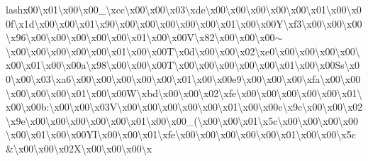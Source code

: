 lash{}x00\textbackslash{}x01\textbackslash{}x00\textbackslash{}x00\+\_\+\textbackslash{}xcc\textbackslash{}x00\textbackslash{}x00\textbackslash{}x03\textbackslash{}xde\textbackslash{}x00\textbackslash{}x00\textbackslash{}x00\textbackslash{}x00\textbackslash{}x00\textbackslash{}x01\textbackslash{}x00\textbackslash{}x00f\textbackslash{}x1d\textbackslash{}x00\textbackslash{}x00\textbackslash{}x01\textbackslash{}x90\textbackslash{}x00\textbackslash{}x00\textbackslash{}x00\textbackslash{}x00\textbackslash{}x00\textbackslash{}x01\textbackslash{}x00\textbackslash{}x00\+Y\textbackslash{}xf3\textbackslash{}x00\textbackslash{}x00\textbackslash{}x00\textbackslash{}x96\textbackslash{}x00\textbackslash{}x00\textbackslash{}x00\textbackslash{}x00\textbackslash{}x00\textbackslash{}x01\textbackslash{}x00\textbackslash{}x00\+V\textbackslash{}x82\textbackslash{}x00\textbackslash{}x00\textbackslash{}x00$\sim$\textbackslash{}x00\textbackslash{}x00\textbackslash{}x00\textbackslash{}x00\textbackslash{}x00\textbackslash{}x01\textbackslash{}x00\textbackslash{}x00\+T\textbackslash{}x0d\textbackslash{}x00\textbackslash{}x00\textbackslash{}x02\textbackslash{}xe0\textbackslash{}x00\textbackslash{}x00\textbackslash{}x00\textbackslash{}x00\textbackslash{}x00\textbackslash{}x01\textbackslash{}x00\textbackslash{}x00a\textbackslash{}x98\textbackslash{}x00\textbackslash{}x00\textbackslash{}x00\+T\textbackslash{}x00\textbackslash{}x00\textbackslash{}x00\textbackslash{}x00\textbackslash{}x00\textbackslash{}x01\textbackslash{}x00\textbackslash{}x00\+Ss\textbackslash{}x00\textbackslash{}x00\textbackslash{}x03\textbackslash{}xa6\textbackslash{}x00\textbackslash{}x00\textbackslash{}x00\textbackslash{}x00\textbackslash{}x00\textbackslash{}x01\textbackslash{}x00\textbackslash{}x00e9\textbackslash{}x00\textbackslash{}x00\textbackslash{}x00\textbackslash{}xfa\textbackslash{}x00\textbackslash{}x00\textbackslash{}x00\textbackslash{}x00\textbackslash{}x00\textbackslash{}x01\textbackslash{}x00\textbackslash{}x00\+W\textbackslash{}xbd\textbackslash{}x00\textbackslash{}x00\textbackslash{}x02\textbackslash{}xfe\textbackslash{}x00\textbackslash{}x00\textbackslash{}x00\textbackslash{}x00\textbackslash{}x00\textbackslash{}x01\textbackslash{}x00\textbackslash{}x00b\+:\textbackslash{}x00\textbackslash{}x00\textbackslash{}x03\+V\textbackslash{}x00\textbackslash{}x00\textbackslash{}x00\textbackslash{}x00\textbackslash{}x00\textbackslash{}x01\textbackslash{}x00\textbackslash{}x00c\textbackslash{}x9c\textbackslash{}x00\textbackslash{}x00\textbackslash{}x02\textbackslash{}x9e\textbackslash{}x00\textbackslash{}x00\textbackslash{}x00\textbackslash{}x00\textbackslash{}x00\textbackslash{}x01\textbackslash{}x00\textbackslash{}x00\+\_\+(\textbackslash{}x00\textbackslash{}x00\textbackslash{}x01\textbackslash{}x5c\textbackslash{}x00\textbackslash{}x00\textbackslash{}x00\textbackslash{}x00\textbackslash{}x00\textbackslash{}x01\textbackslash{}x00\textbackslash{}x00\+Y\+I\textbackslash{}x00\textbackslash{}x00\textbackslash{}x01\textbackslash{}xfe\textbackslash{}x00\textbackslash{}x00\textbackslash{}x00\textbackslash{}x00\textbackslash{}x00\textbackslash{}x01\textbackslash{}x00\textbackslash{}x00\textbackslash{}x5c\&\textbackslash{}x00\textbackslash{}x00\textbackslash{}x02\+X\textbackslash{}x00\textbackslash{}x00\textbackslash{}x00\textbackslash{}x